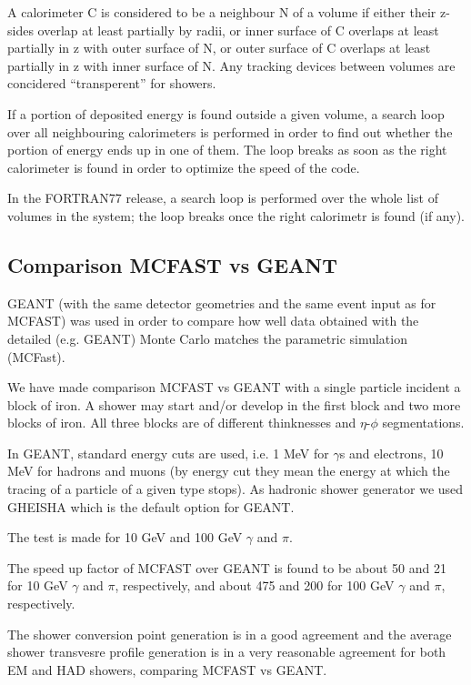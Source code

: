 A calorimeter C is considered to be a neighbour N of a volume if either their z-sides
overlap at least partially by radii, or inner surface of C overlaps at least partially 
in z with outer surface of N, or outer surface of C overlaps at least partially
in z with inner surface of N. Any tracking devices between volumes are concidered
``transperent'' for showers.  

If a portion of deposited energy is found outside a given volume, a search loop
over all neighbouring calorimeters is performed in order to find out whether the
portion of energy ends up in one of them. The loop breaks as soon as the right
calorimeter is found in order to optimize the speed of the code.

In the FORTRAN77 release, a search loop is performed over the whole list of volumes
in the system; the loop breaks once the right calorimetr is found (if any).

\bigskip

\subsection{Comparison MCFAST vs GEANT}

GEANT (with the same detector geometries and the same event input as for 
MCFAST) was used in order to compare how well data obtained with the detailed 
(e.g. GEANT)  Monte Carlo matches the parametric simulation (MCFast). 

We have made comparison MCFAST vs GEANT with a single particle incident a block of iron.
A shower may start and/or develop in the first block and two more blocks of iron. All
three blocks are of different thinknesses and $\eta$-$\phi$ segmentations.

In GEANT, standard energy cuts are used, i.e. 1 MeV for $\gamma$s and electrons, 10 MeV for
hadrons and muons (by energy cut they mean the energy at which the tracing of a particle 
of a given type stops). 
As hadronic shower generator we used GHEISHA which is the default option for GEANT.

The test is made for 10 GeV and 100 GeV $\gamma$ and $\pi$. 

The speed up factor of MCFAST over GEANT is found to be about 50 and 21 for 10 GeV $\gamma$
and $\pi$, respectively, and about 475 and 200 for 100 GeV $\gamma$ and $\pi$, respectively.

The shower conversion point generation is in a good agreement and 
the average shower transvesre profile generation is in a very reasonable 
agreement for both EM and HAD showers, comparing MCFAST vs GEANT. 


